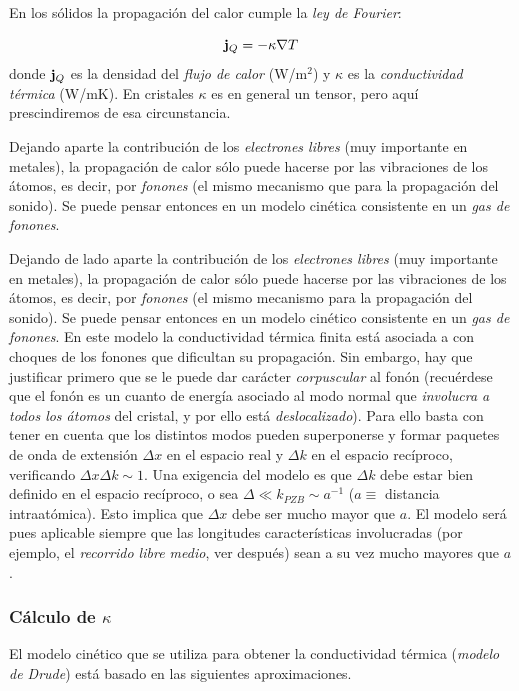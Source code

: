 En los sólidos la propagación del calor cumple la \textit{ley de Fourier}:

\begin{equation}
    \mathbf{j}_Q = - \kappa \nabla T
\end{equation}
donde $\mathbf{j}_Q$ es la densidad del \textit{flujo de calor} (W/m$^2$) y $\kappa$ es la \textit{conductividad térmica} (W/mK). En cristales $\kappa$ es en general un tensor, pero aquí prescindiremos de esa circunstancia. 

Dejando aparte la contribución de los \textit{electrones libres} (muy importante en metales), la propagación de calor sólo puede hacerse por las vibraciones de los átomos, es decir, por \textit{fonones} (el mismo mecanismo que para la propagación del sonido). Se puede pensar entonces en un modelo cinética consistente en un \textit{gas de fonones}. 


Dejando de lado aparte la contribución de los \textit{electrones libres} (muy importante en metales), la propagación de calor sólo puede hacerse por las vibraciones de los átomos, es decir, por \textit{fonones} (el mismo mecanismo para la propagación del sonido). Se puede pensar entonces en un modelo cinético consistente en un \textit{gas de fonones}. En este modelo la conductividad térmica finita está asociada a con choques de los fonones que dificultan su propagación. Sin embargo, hay que justificar primero que se le puede dar carácter \textit{corpuscular} al fonón (recuérdese que el fonón es un cuanto de energía asociado al modo normal que \textit{involucra a todos los átomos} del cristal, y por ello está \textit{deslocalizado}). Para ello basta con tener en cuenta que los distintos modos pueden superponerse y formar paquetes de onda de extensión $\Delta x$ en el espacio real y $\Delta k$ en el espacio recíproco, verificando $\Delta x \Delta k \sim 1$. Una exigencia del modelo es que $\Delta k$ debe estar bien definido en el espacio recíproco, o sea $\Delta \ll k_{PZB} \sim a^{-1}$ ($a\equiv$ distancia intraatómica). Esto implica que $\Delta x$ debe ser mucho mayor que $a$. El modelo será pues aplicable siempre que las longitudes características involucradas (por ejemplo, el \textit{recorrido libre medio}, ver después) sean a su vez mucho mayores que $a$. 

\subsubsection{Cálculo de $\kappa$}

El modelo cinético que se utiliza para obtener la conductividad térmica (\textit{modelo de Drude}) está basado en las siguientes aproximaciones.

